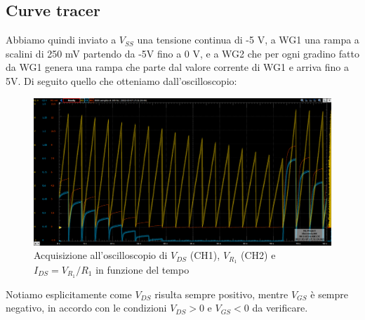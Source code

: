 \documentclass[10pt, a4paper, italian]{article}
\begin{document}
\subsection{Curve tracer}
Abbiamo quindi inviato a $V_{SS}$ una tensione continua di -5 V, a WG1 una rampa a scalini di 250 mV partendo da -5V fino a 0 V, e a WG2 che per ogni gradino fatto da WG1 genera una rampa che parte dal valore corrente di WG1 e arriva fino a 5V.
Di seguito quello che otteniamo dall'oscilloscopio:
\begin{figure}[htbp]
    \centering
	\includegraphics[scale=0.4]{timey}
    \caption{Acquisizione all'oscilloscopio di $V_{DS}$ (CH1), $V_{R_1}$ (CH2)
    e $I_{DS} = V_{R_1}/R_1$ in funzione del tempo}
\end{figure}
Notiamo esplicitamente come $V_{DS}$ risulta sempre positivo, mentre $V_{GS}$
è sempre negativo, in accordo con le condizioni $V_{DS} > 0$ e $V_{GS} < 0$
da verificare.
\end{document}
